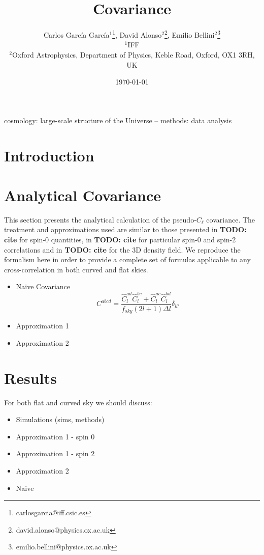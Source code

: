 \documentclass[useAMS,usenatbib]{mn2e}
\title[Covariance]{Covariance}
\author[C. Garc\'{i}a Garc\'{i}a et al.]{Carlos Garc\'{i}a Garc\'{i}a$^1$\thanks{carlosgarcia@iff.csic.es}, David Alonso$^2$\thanks{david.alonso@physics.ox.ac.uk}, Emilio Bellini$^2$\thanks{emilio.bellini@physics.ox.ac.uk}\\
$^{1}$IFF\\
$^{2}$Oxford Astrophysics, Department of Physics, Keble Road, Oxford, OX1 3RH, UK
}
\newcommand{\todo}[1]{{\bf TODO: #1}}
\newcommand{\pcl}[3]{\hat C_{#1}^{#2 #3}}
\begin{document}
  \date{\today}
   
  \maketitle

\begin{abstract}
\end{abstract}

\begin{keywords}
  cosmology: large-scale structure of the Universe -- methods: data analysis
\end{keywords}

\section{Introduction}
    
\section{Analytical Covariance}
This section presents the analytical calculation of the pseudo-$C_\ell$ covariance. The treatment and approximations used are similar to those presented in \todo{cite} for spin-0 quantities, in \todo{cite} for particular spin-0 and spin-2 correlations and in \todo{cite} for the 3D density field. We reproduce the formalism here in order to provide a complete set of formulas applicable to any cross-correlation in both curved and flat skies.



\begin{itemize}
\item Naive Covariance
  \begin{equation}
    C^{abcd} = \frac{\pcl{l}ad \pcl{l}bc + \pcl{l}ac \pcl{l}bd}{f_{sky} (2l +
      1) \Delta l} \delta_{ll'}
  \end{equation}
\item Approximation 1
\item Approximation 2
\end{itemize}

\section{Results}
For both flat and curved sky we should discuss:
\begin{itemize}
\item Simulations (sims, methods)
\item Approximation 1 - spin 0
\item Approximation 1 - spin 2
\item Approximation 2
\item Naive
\end{itemize}
\end{document}
